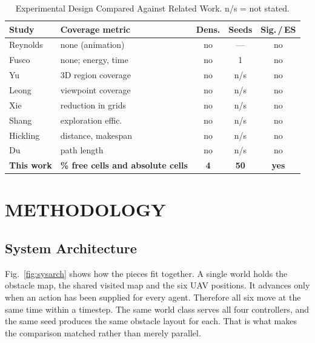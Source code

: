 \documentclass[a4paper, 10pt, conference]{ieeeconf}
\begin{document}
\begin{table}[htb]
\centering
\caption{Experimental Design Compared Against Related Work.
n/s = not stated.}
\label{tab:related}
\scriptsize
\setlength{\tabcolsep}{3pt}
\begin{tabular}{llccc}
\toprule
\textbf{Study} & \textbf{Coverage metric} & \textbf{Dens.} &
\textbf{Seeds} & \textbf{Sig.\,/\,ES} \\
\midrule
Reynolds~\cite{reynolds1987} & none (animation) & no & --- & no \\
Fusco~\cite{fusco2025}       & none; energy, time & no & 1 & no \\
Yu~\cite{yu2025}             & 3D region coverage & no & n/s & no \\
Leong~\cite{leong2024}       & viewpoint coverage & no & n/s & no \\
Xie~\cite{xie2025}           & reduction in grids & no & n/s & no \\
Shang~\cite{shang2025}       & exploration effic. & no & n/s & no \\
Hickling~\cite{hickling2025} & distance, makespan & no & n/s & no \\
Du~\cite{du2023}             & path length & no & n/s & no \\
\midrule
\textbf{This work} & \textbf{\% free cells and absolute cells} &
\textbf{4} & \textbf{50} & \textbf{yes} \\
\bottomrule
\end{tabular}
\end{table}

\section{METHODOLOGY}\label{sec:methodology}

\subsection{System Architecture}\label{sec:arch}

Fig.~\ref{fig:sysarch} shows how the pieces fit together. A single
world holds the obstacle map, the shared visited map and the six UAV
positions. It advances only when an action has been supplied for every
agent. Therefore all six move at the same time within a timestep. The
same world class serves all four controllers, and the same seed
produces the same obstacle layout for each. That is what makes the
comparison matched rather than merely parallel.
\end{document}

